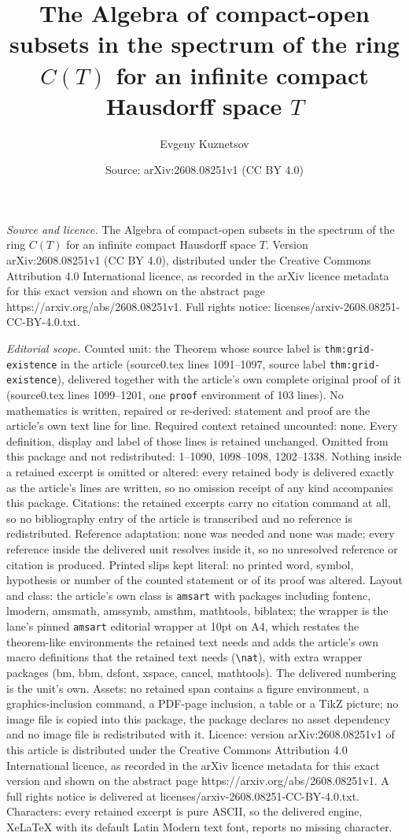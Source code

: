 \documentclass[10pt,a4paper]{amsart}
\title[The Algebra of compact-open subsets in the spectrum of the r]{The Algebra of compact-open subsets in the spectrum of the ring $C(T)$ for an infinite compact Hausdorff space $T$}
\author{Evgeny Kuznetsov}
\date{Source: arXiv:2608.08251v1 (CC BY 4.0)}
\begin{document}
\maketitle

\noindent\emph{Source and licence.} The Algebra of compact-open subsets in the spectrum of the ring $C(T)$ for an infinite compact Hausdorff space $T$. Version arXiv:2608.08251v1 (CC BY 4.0), distributed under the Creative Commons Attribution 4.0 International licence, as recorded in the arXiv licence metadata for this exact version and shown on the abstract page https://arxiv.org/abs/2608.08251v1. Full rights notice: licenses/arxiv-2608.08251-CC-BY-4.0.txt.\par\smallskip

\noindent\textit{Editorial scope.} Counted unit: the Theorem whose source label is \texttt{thm:grid-existence} in the article (source0.tex lines 1091--1097, source label \texttt{thm:grid-existence}), delivered together with the article's own complete original proof of it (source0.tex lines 1099--1201, one \texttt{proof} environment of 103 lines). No mathematics is written, repaired or re-derived: statement and proof are the article's own text line for line. Required context retained uncounted: none. Every definition, display and label of those lines is retained unchanged. Omitted from this package and not redistributed: 1--1090, 1098--1098, 1202--1338. Nothing inside a retained excerpt is omitted or altered: every retained body is delivered exactly as the article's lines are written, so no omission receipt of any kind accompanies this package. Citations: the retained excerpts carry no citation command at all, so no bibliography entry of the article is transcribed and no reference is redistributed. Reference adaptation: none was needed and none was made; every reference inside the delivered unit resolves inside it, so no unresolved reference or citation is produced. Printed slips kept literal: no printed word, symbol, hypothesis or number of the counted statement or of its proof was altered. Layout and class: the article's own class is \texttt{amsart} with packages including fontenc, lmodern, amsmath, amssymb, amsthm, mathtools, biblatex; the wrapper is the lane's pinned \texttt{amsart} editorial wrapper at 10pt on A4, which restates the theorem-like environments the retained text needs and adds the article's own macro definitions that the retained text needs (\texttt{\textbackslash nat}), with extra wrapper packages (bm, bbm, dsfont, xspace, cancel, mathtools). The delivered numbering is the unit's own. Assets: no retained span contains a figure environment, a graphics-inclusion command, a PDF-page inclusion, a table or a TikZ picture; no image file is copied into this package, the package declares no asset dependency and no image file is redistributed with it. Licence: version arXiv:2608.08251v1 of this article is distributed under the Creative Commons Attribution 4.0 International licence, as recorded in the arXiv licence metadata for this exact version and shown on the abstract page https://arxiv.org/abs/2608.08251v1. A full rights notice is delivered at licenses/arxiv-2608.08251-CC-BY-4.0.txt. Characters: every retained excerpt is pure ASCII, so the delivered engine, XeLaTeX with its default Latin Modern text font, reports no missing character.
\end{document}
